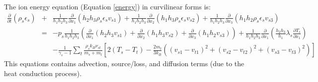 \documentclass[11pt,letterpaper]{article}
\begin{document}
The ion energy equation (Equation \ref{energy}) in curvilinear forms is:  
\begin{eqnarray}
\frac{\partial}{\partial t} \left( \rho_s \epsilon_s \right) &+& \frac{1}{h_1 h_2 h_3} \frac{\partial}{\partial x_1} \left( h_2 h_3 \rho_s \epsilon_s v_{s1} \right) + \frac{1}{h_1 h_2 h_3} \frac{\partial}{\partial x_2} \left( h_1 h_3 \rho_s \epsilon_s v_{s2} \right) + \frac{1}{h_1 h_2 h_3} \frac{\partial}{\partial x_3} \left( h_1 h_2 \rho_s \epsilon_s v_{s3} \right) \nonumber \\
&=& -p_s \frac{1}{h_1 h_2 h_3} \left( \frac{\partial}{\partial x_1} \left( h_2 h_3 v_{s1} \right) + \frac{\partial}{\partial x_2} \left( h_1 h_3 v_{s2} \right) + \frac{\partial}{\partial x_3} \left( h_1 h_2 v_{s3} \right) \right) + \frac{1}{h_1 h_2 h_3} \frac{\partial}{\partial x_1} \left( \frac{h_2 h_3}{h_1} \lambda_s \frac{\partial T_s}{\partial x_1} \right) \nonumber \\
&~& - \frac{1}{\gamma_s - 1} \sum_t \frac{\rho_s k_B \nu_{st}}{m_s + m_t} \left[ 2 \left( T_s - T_t \right) - \frac{2 m_t}{3 k_B} \left( \left( v_{s1} - v_{t1} \right)^2 + \left( v_{s2} - v_{t2} \right)^2 + \left( v_{s3} - v_{t3} \right)^2 \right) \right] \label{eqn:ionenergycoord}
\end{eqnarray}
This equations contains advection, source/loss, and diffusion terms (due to the heat conduction process).  
\end{document}
